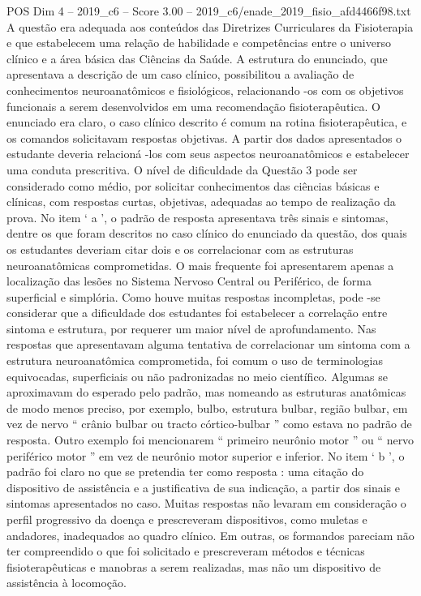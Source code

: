\begin{textsample}{POS Dim 4 – 2019\_c6 – Score 3.00 – 2019\_c6/enade\_2019\_fisio\_afd4466f98.txt}
A questão era adequada aos conteúdos das Diretrizes Curriculares da Fisioterapia e que estabelecem uma relação de habilidade e competências entre o universo clínico e a área básica das Ciências da Saúde.
A estrutura do enunciado, que apresentava a descrição de um caso clínico, possibilitou a avaliação de conhecimentos neuroanatômicos e fisiológicos, relacionando -os com os objetivos funcionais a serem desenvolvidos em uma recomendação fisioterapêutica.
O enunciado era claro, o caso clínico descrito é comum na rotina fisioterapêutica, e os comandos solicitavam respostas objetivas.
A partir dos dados apresentados o estudante deveria relacioná -los com seus aspectos neuroanatômicos e estabelecer uma conduta prescritiva.
O nível de dificuldade da Questão 3 pode ser considerado como médio, por solicitar conhecimentos das ciências básicas e clínicas, com respostas curtas, objetivas, adequadas ao tempo de realização da prova.
No item ‘ a ’, o padrão de resposta apresentava três sinais e sintomas, dentre os que foram descritos no caso clínico do enunciado da questão, dos quais os estudantes deveriam citar dois e os correlacionar com as estruturas neuroanatômicas comprometidas.
O mais frequente foi apresentarem apenas a localização das lesões no Sistema Nervoso Central ou Periférico, de forma superficial e simplória.
Como houve muitas respostas incompletas, pode -se considerar que a dificuldade dos estudantes foi estabelecer a correlação entre sintoma e estrutura, por requerer um maior nível de aprofundamento.
Nas respostas que apresentavam alguma tentativa de correlacionar um sintoma com a estrutura neuroanatômica comprometida, foi comum o uso de terminologias equivocadas, superficiais ou não padronizadas no meio científico.
Algumas se aproximavam do esperado pelo padrão, mas nomeando as estruturas anatômicas de modo menos preciso, por exemplo, bulbo, estrutura bulbar, região bulbar, em vez de nervo “ crânio bulbar ou tracto córtico-bulbar ” como estava no padrão de resposta.
Outro exemplo foi mencionarem “ primeiro neurônio motor ” ou “ nervo periférico motor ” em vez de neurônio motor superior e inferior.
No item ‘ b ’, o padrão foi claro no que se pretendia ter como resposta : uma citação do dispositivo de assistência e a justificativa de sua indicação, a partir dos sinais e sintomas apresentados no caso.
Muitas respostas não levaram em consideração o perfil progressivo da doença e prescreveram dispositivos, como muletas e andadores, inadequados ao quadro clínico.
Em outras, os formandos pareciam não ter compreendido o que foi solicitado e prescreveram métodos e técnicas fisioterapêuticas e manobras a serem realizadas, mas não um dispositivo de assistência à locomoção.

\end{textsample}
